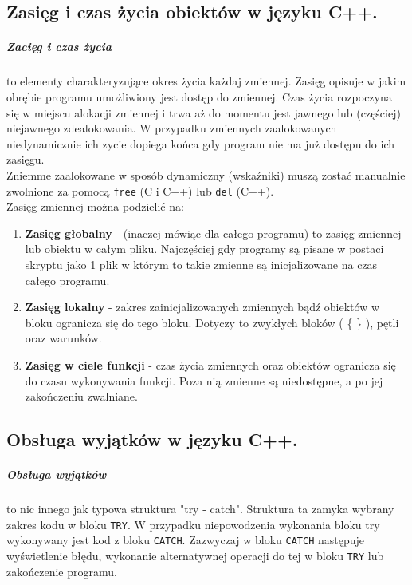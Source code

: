 \documentclass[a4paper,12pt,oneside]{book}
\begin{document}
				
				
			\newpage\subsection{Zasięg i czas życia obiektów w języku C++.}
				\subparagraph{Zacięg i czas życia}to elementy charakteryzujące okres życia każdaj zmiennej. Zasięg opisuje w jakim obrębie programu umożliwiony jest dostęp do zmiennej. Czas życia rozpoczyna się w miejscu alokacji zmiennej i trwa aż do momentu jest jawnego lub (częściej) niejawnego zdealokowania. W przypadku zmiennych zaalokowanych niedynamicznie ich zycie dopiega końca gdy program nie ma już dostępu do ich zasięgu.\\
				
				Zniemme zaalokowane w sposób dynamiczny (wskaźniki) muszą zostać manualnie zwolnione za pomocą \verb*|free| (C i C++) lub \verb*|del| (C++).\\
				
				Zasięg zmiennej można podzielić na:
				\begin{enumerate}
					\item \textbf{Zasięg głobalny} - (inaczej mówiąc dla całego programu) to zasięg zmiennej lub obiektu w całym pliku. Najczęściej gdy programy są pisane w postaci skryptu jako 1 plik w którym to takie zmienne są inicjalizowane na czas całego programu.
					\item \textbf{Zasięg lokalny} - zakres zainicjalizowanych zmiennych bądź obiektów w bloku ogranicza się do tego bloku. Dotyczy to zwykłych bloków ( \{ \} ), pętli oraz warunków.
					\item \textbf{Zasięg w ciele funkcji} - czas życia zmiennych oraz obiektów ogranicza się do czasu wykonywania funkcji. Poza nią zmienne są niedostępne, a po jej zakończeniu zwalniane.
				\end{enumerate}
			\newpage\subsection{Obsługa wyjątków w języku C++.}
				\subparagraph{Obsługa wyjątków}to nic innego jak typowa struktura "try - catch". Struktura ta zamyka wybrany zakres kodu w bloku \verb*|TRY|. W przypadku niepowodzenia wykonania bloku try wykonywany jest kod z bloku \verb*|CATCH|. Zazwyczaj w bloku \verb*|CATCH| następuje wyświetlenie błędu, wykonanie alternatywnej operacji do tej w bloku \verb*|TRY| lub zakończenie programu.\\
				
\end{document}
